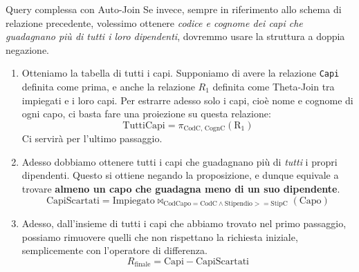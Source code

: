 \documentclass[12pt]{report}
\begin{document}
	\begin{esempio}{Query complessa con Auto-Join}{}
		Se invece, sempre in riferimento allo schema di relazione precedente, volessimo ottenere \textit{codice e cognome dei capi che guadagnano più di tutti i loro dipendenti}, dovremmo usare la struttura a doppia negazione.
		
		\begin{enumerate}
			\item Otteniamo la tabella di tutti i capi. Supponiamo di avere la relazione \texttt{Capi} definita come prima, e anche la relazione $R_1$ definita come Theta-Join tra impiegati e i loro capi. Per estrarre adesso solo i capi, cioè nome e cognome di ogni capo, ci basta fare una proiezione su questa relazione:
			\[
				\text{TuttiCapi} = \pi_{\text{CodC, CognC}}(\text{R}_1)
			\]
			Ci servirà per l'ultimo passaggio.
			
			\item Adesso dobbiamo ottenere tutti i capi che guadagnano più di \textit{tutti} i propri dipendenti. Questo si ottiene negando la proposizione, e dunque equivale a trovare \textbf{almeno un capo che guadagna meno di un suo dipendente}.
			\[
				\text{CapiScartati} = \text{Impiegato} \bowtie_{\text{CodCapo} = \text{CodC} \land \text{Stipendio} >= \text{StipC}}(\text{Capo})
			\]
			
			\item Adesso, dall'insieme di tutti i capi che abbiamo trovato nel primo passaggio, possiamo rimuovere quelli che non rispettano la richiesta iniziale, semplicemente con l'operatore di differenza.
			\[
				R_{\text{finale}} = \text{Capi} - \text{CapiScartati}
			\]
		\end{enumerate}
	\end{esempio}
	
\end{document}
